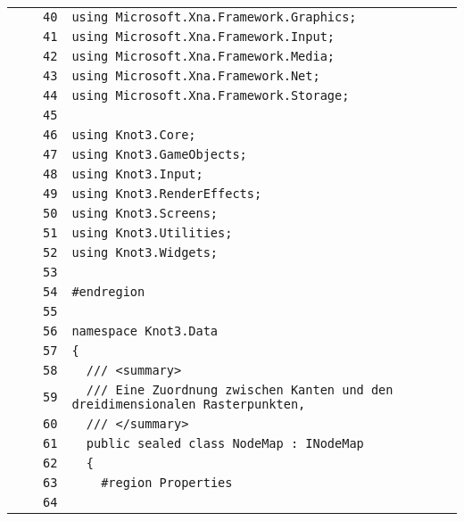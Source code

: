 \documentclass[a4paper,10pt]{article}
\begin{document}
\begin{longtable}[l]{lrrl}
\cellcolor{gray} &  & \verb~40~ & \verb~using Microsoft.Xna.Framework.Graphics;~\\
\cellcolor{gray} &  & \verb~41~ & \verb~using Microsoft.Xna.Framework.Input;~\\
\cellcolor{gray} &  & \verb~42~ & \verb~using Microsoft.Xna.Framework.Media;~\\
\cellcolor{gray} &  & \verb~43~ & \verb~using Microsoft.Xna.Framework.Net;~\\
\cellcolor{gray} &  & \verb~44~ & \verb~using Microsoft.Xna.Framework.Storage;~\\
\cellcolor{gray} &  & \verb~45~ & \verb~~\\
\cellcolor{gray} &  & \verb~46~ & \verb~using Knot3.Core;~\\
\cellcolor{gray} &  & \verb~47~ & \verb~using Knot3.GameObjects;~\\
\cellcolor{gray} &  & \verb~48~ & \verb~using Knot3.Input;~\\
\cellcolor{gray} &  & \verb~49~ & \verb~using Knot3.RenderEffects;~\\
\cellcolor{gray} &  & \verb~50~ & \verb~using Knot3.Screens;~\\
\cellcolor{gray} &  & \verb~51~ & \verb~using Knot3.Utilities;~\\
\cellcolor{gray} &  & \verb~52~ & \verb~using Knot3.Widgets;~\\
\cellcolor{gray} &  & \verb~53~ & \verb~~\\
\cellcolor{gray} &  & \verb~54~ & \verb~#endregion~\\
\cellcolor{gray} &  & \verb~55~ & \verb~~\\
\cellcolor{gray} &  & \verb~56~ & \verb~namespace Knot3.Data~\\
\cellcolor{gray} &  & \verb~57~ & \verb~{~\\
\cellcolor{gray} &  & \verb~58~ & \verb~  /// <summary>~\\
\cellcolor{gray} &  & \verb~59~ & \verb~  /// Eine Zuordnung zwischen Kanten und den dreidimensionalen Rasterpunkten, ~\\
\cellcolor{gray} &  & \verb~60~ & \verb~  /// </summary>~\\
\cellcolor{gray} &  & \verb~61~ & \verb~  public sealed class NodeMap : INodeMap~\\
\cellcolor{gray} &  & \verb~62~ & \verb~  {~\\
\cellcolor{gray} &  & \verb~63~ & \verb~    #region Properties~\\
\cellcolor{gray} &  & \verb~64~ & \verb~~\\

\end{longtable}
\end{document}
